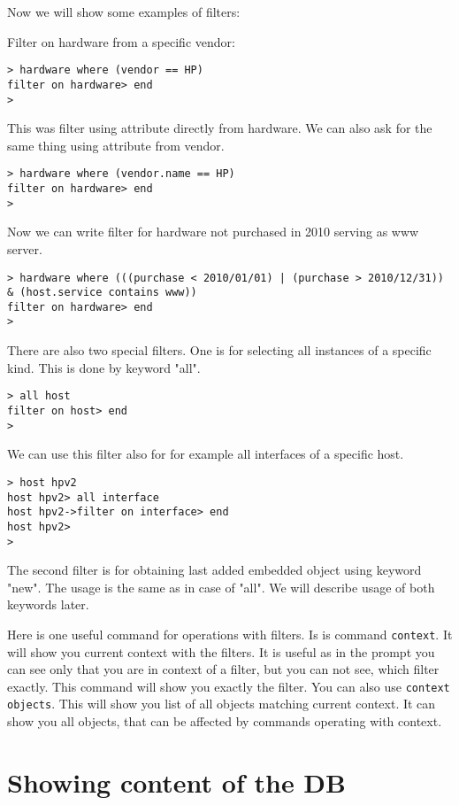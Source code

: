 \documentclass[deska]{subfiles}
\begin{document}
Now we will show some examples of filters:

Filter on hardware from a specific vendor:
\begin{verbatim}
> hardware where (vendor == HP)
filter on hardware> end
>
\end{verbatim}

This was filter using attribute directly from hardware. We can also ask for the same thing using attribute from vendor.
\begin{verbatim}
> hardware where (vendor.name == HP)
filter on hardware> end
>
\end{verbatim}

Now we can write filter for hardware not purchased in 2010 serving as www server.

\begin{verbatim}
> hardware where (((purchase < 2010/01/01) | (purchase > 2010/12/31)) & (host.service contains www))
filter on hardware> end
>
\end{verbatim}

There are also two special filters. One is for selecting all instances of a specific kind. This is done by keyword "all".
\begin{verbatim}
> all host
filter on host> end
>
\end{verbatim}

We can use this filter also for for example all interfaces of a specific host.
\begin{verbatim}
> host hpv2
host hpv2> all interface
host hpv2->filter on interface> end
host hpv2>
>
\end{verbatim}

The second filter is for obtaining last added embedded object using keyword "new". The usage is the same as in case of
"all". We will describe usage of both keywords later.

Here is one useful command for operations with filters. Is is command {\tt context}. It will show you current context
with the filters. It is useful as in the prompt you can see only that you are in context of a filter, but you can not
see, which filter exactly. This command will show you exactly the filter. You can also use {\tt context objects}. This
will show you list of all objects matching current context. It can show you all objects, that can be affected by commands
operating with context.

\section{Showing content of the DB}
\end{document}
